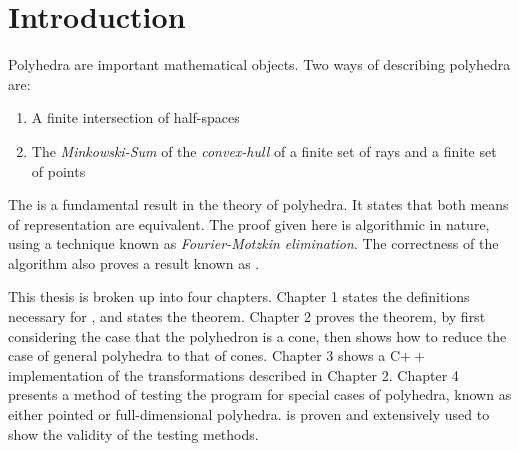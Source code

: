 \chapter*{Introduction}

Polyhedra are important mathematical objects.  Two ways of describing polyhedra are:
\begin{enumerate}
  \item A finite intersection of half-spaces
  \item The \textit{Minkowski-Sum} of the \textit{convex-hull} of a finite set of rays and a finite set of points
\end{enumerate}
The {\MWT} is a fundamental result in the theory of polyhedra.  It states that both means of representation are equivalent.  The proof given here is algorithmic in nature, using a technique known as \textit{Fourier-Motzkin elimination}.  The correctness of the algorithm also proves a result known as .

This thesis is broken up into four chapters.  Chapter 1 states the definitions necessary for {\MWT}, and states the theorem.  Chapter 2 proves the theorem, by first considering the case that the polyhedron is a cone, then shows how to reduce the case of general polyhedra to that of cones.  Chapter 3 shows a C$++$ implementation of the transformations described in Chapter 2.  Chapter 4 presents a method of testing the program for special cases of polyhedra, known as either pointed or full-dimensional polyhedra.   is proven and extensively used to show the validity of the testing methods.
